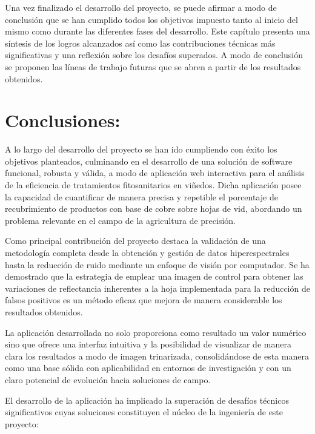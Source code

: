 
Una vez finalizado el desarrollo del proyecto, se puede afirmar  a modo de conclusión que se han cumplido todos los objetivos impuesto tanto al inicio del mismo como durante las diferentes fases del desarrollo. Este capítulo presenta una síntesis de los logros alcanzados así como las contribuciones técnicas más significativas y una reflexión sobre los desafíos superados. A modo de conclusión se proponen las líneas de trabajo futuras que se abren a partir de los resultados obtenidos.

\section{Conclusiones:}
A lo largo del desarrollo del proyecto se han ido cumpliendo con éxito los objetivos planteados, culminando en el desarrollo de una solución de software funcional, robusta y válida, a modo de aplicación web interactiva para el análisis de la eficiencia de tratamientos fitosanitarios en viñedos. Dicha aplicación posee la capacidad de cuantificar de manera precisa y repetible el porcentaje de recubrimiento de productos con base de cobre sobre hojas de vid, abordando un problema relevante en el campo de la agricultura de precisión.

Como principal contribución del proyecto destaca la validación de una metodología completa desde la obtención y gestión de datos hiperespectrales hasta la reducción de ruido mediante un enfoque de visión por computador. Se ha demostrado que la estrategia de emplear una imagen de control para obtener las variaciones de reflectancia inherentes a la hoja  implementada para la reducción de falsos positivos es un método eficaz que mejora de manera considerable los resultados obtenidos.

La aplicación desarrollada no solo proporciona como resultado un valor numérico sino que ofrece una interfaz intuitiva y la posibilidad de visualizar de manera clara los resultados a modo de imagen trinarizada, consolidándose de esta manera como una base sólida con aplicabilidad en entornos de  investigación y con un claro potencial de evolución hacia soluciones de campo.

El desarrollo de la aplicación ha implicado la superación de desafíos técnicos significativos cuyas soluciones constituyen el núcleo de la ingeniería de este proyecto:

